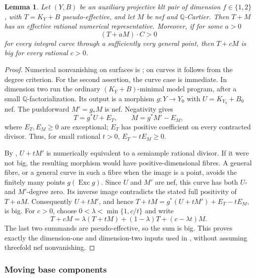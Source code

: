 \documentclass[12pt,a4paper,psamsfonts]{amsart}
\theoremstyle{definition}
\theoremstyle{plain}
\newtheorem{lemma}{Lemma}[section]
\newcommand{\Q}{\mathbb Q}
\begin{document}
\begin{lemma}\label{lem:lower-dimensional}
Let $(Y,B)$ be an auxiliary projective klt pair of dimension
$f\in\{1,2\}$, with $T=K_Y+B$ pseudo-effective, and let $M$ be
nef and $\mathbb{Q}$-Cartier. Then $T+M$ has an effective rational
numerical representative. Moreover, if for some $a>0$
\[
 (T+aM)\cdot C>0
\]
for every integral curve through a sufficiently very general point,
then $T+cM$ is big for every rational $c>0$.
\end{lemma}
\begin{proof}
Numerical nonvanishing on surfaces is
\cite[Corollary~C]{LP}; on curves it follows from the degree criterion. For the second assertion, the curve case is immediate.
In dimension two run the ordinary $(K_Y+B)$-minimal model program,
after a small $\Q$-factorialization. Its output is a morphism
$g:Y\to Y_0$ with $U=K_{Y_0}+B_0$ nef. The pushforward
$M'=g_*M$ is nef. Negativity gives
\[
 T=g^*U+E_T,\qquad M=g^*M'-E_M,
\]
where $E_T,E_M\ge0$ are exceptional; $E_T$ has positive
coefficient on every contracted divisor. Thus, for small rational
$t>0$, $E_T-tE_M\ge0$.

By \cite[Corollary~C]{LP}, $U+tM'$ is numerically equivalent
to a semiample rational divisor. If it were not big, the resulting
morphism would have positive-dimensional fibres. A general fibre,
or a general curve in such a fibre when the image is a point,
avoids the finitely many points $g(\operatorname{Exc}g)$.
Since $U$ and $M'$ are nef, this curve has both $U$- and $M'$-degree
zero. Its inverse image contradicts the stated full positivity of
$T+aM$. Consequently $U+tM'$, and hence
$T+tM=g^*(U+tM')+E_T-tE_M$, is big.
For $c>0$, choose $0<\lambda<\min\{1,c/t\}$ and write
\[
 T+cM=\lambda(T+tM)+(1-\lambda)T+(c-\lambda t)M.
\]
The last two summands are pseudo-effective, so the sum is big.
This proves exactly the dimension-one and dimension-two inputs
used in \cite[Sections~3--5]{NS}, without assuming threefold
nef nonvanishing.
\end{proof}

\subsubsection{Moving base components}
\end{document}
